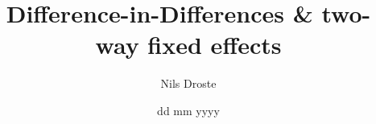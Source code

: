 \documentclass[aspectratio=169]{beamer}
\title[Causal Inference]{Difference-in-Differences \& \newline two-way fixed effects}
\author{Nils Droste}
\subtitle{}
\date{dd mm yyyy}
\institute{Lund University\\Department for Political Science}
\begin{document}

\titleframe



\end{document}
